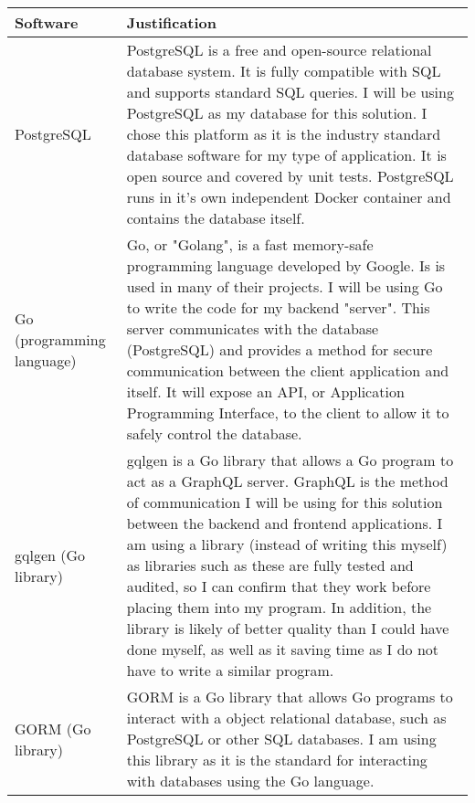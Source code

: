 \documentclass[../../../main.tex]{subfiles}
\begin{document}
\begin{tabular}{ |p{}|p{}| }
    \hline
    \textbf{Software}         & \textbf{Justification}                                                                                                                         \\
    \hline
    PostgreSQL                & PostgreSQL is a free and open-source relational database system. It is fully compatible with SQL and supports standard SQL queries.\newline
    I will be using PostgreSQL as my database for this solution. I chose this platform as it is the industry standard database software for my type of application.
    It is open source and covered by unit tests.\newline
    PostgreSQL runs in it's own independent Docker container and contains the database itself.                                                                                 \\
    \hline
    Go (programming language) & Go, or "Golang", is a fast memory-safe programming language developed by Google. Is is used in many of their projects.\newline
    I will be using Go to write the code for my backend "server".
    This server communicates with the database (PostgreSQL) and provides a method for secure communication between the client application and itself.
    It will expose an API, or Application Programming Interface, to the client to allow it to safely control the database.                                                     \\
    \hline
    gqlgen (Go library)       & gqlgen is a Go library that allows a Go program to act as a GraphQL server.
    GraphQL is the method of communication I will be using for this solution between the backend and frontend applications.\newline
    I am using a library (instead of writing this myself) as libraries such as these are fully tested and audited, so I can confirm that they work before placing them into my program.
    In addition, the library is likely of better quality than I could have done myself, as well as it saving time as I do not have to write a similar program.                 \\
    \hline
    GORM (Go library)         & GORM is a Go library that allows Go programs to interact with a object relational database, such as PostgreSQL or other SQL databases.\newline
    I am using this library as it is the standard for interacting with databases using the Go language.                                                                        \\
    \hline
\end{tabular}
\end{document}
